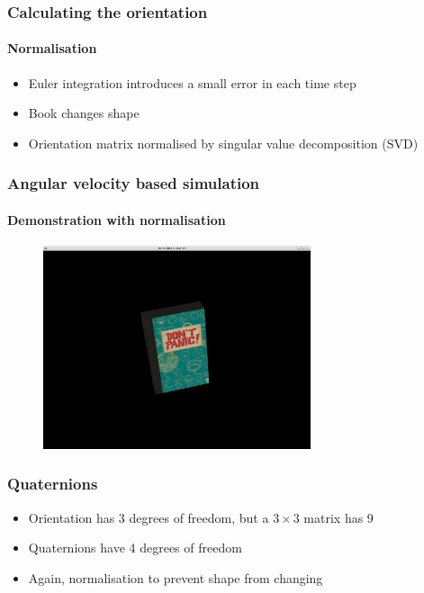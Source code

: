 \documentclass{beamer}
\begin{document}
\begin{frame}
 \frametitle{Calculating the orientation} 
 \framesubtitle{Normalisation}
 \begin{itemize}
  \item Euler integration introduces a small error in each time step
  \item Book changes shape
  \item Orientation matrix normalised by singular value decomposition (SVD)
 \end{itemize}
\end{frame}

\begin{frame}
 \frametitle{Angular velocity based simulation}
 \framesubtitle{Demonstration with normalisation}
 \begin{figure}
  \centering
  \includegraphics[width=0.7\textwidth]{demo.jpg}
 \end{figure}
\end{frame}

\begin{frame}
 \frametitle{Quaternions} 
 \begin{itemize}
  \item Orientation has 3 degrees of freedom, but a $3\times3$ matrix has 9
  \item Quaternions have 4 degrees of freedom
  \item Again, normalisation to prevent shape from changing
 \end{itemize}
\end{frame}
\end{document}
